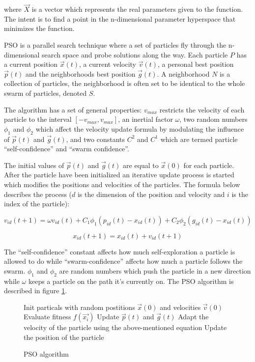 where $\vec{X}$ is a vector which represents the real parameters given to the function. The intent is to find a point in the n-dimensional parameter hyperspace that minimizes the function.

PSO is a parallel search technique where a set of particles  fly through the n-dimensional search space and probe solutions along the way. Each particle $P$ has a current position $\vec{x}(t)$, a current velocity $\vec{v}(t)$, a personal best position $\vec{p}(t)$ and the neighborhoods best position $\vec{g}(t)$. A neighborhood $N$ is a collection of particles, the neighborhood is often set to be identical to the whole swarm of particles, denoted $S$.

The algorithm has a set of general properties: $v_{max}$ restricts the velocity of each particle to the interval $[-v_{max},v_{max}]$, an inertial factor $\omega$, two random numbers $\phi_1$ and $\phi_2$ which affect the velocity update formula by modulating the influence of $\vec{p}(t)$ and $\vec{g}(t)$, and two constants $C^2$ and $C^1$ which are termed particle “self-confidence” and “swarm confidence”.

The initial values of $\vec{p}(t)$ and $\vec{g}(t)$ are equal to $\vec{x}(0)$ for each particle. After the particle have been initialized an iterative update process is started which modifies the positions and velocities of the particles. The formula below describes the process ($d$ is the dimension of the position and velocity and $i$ is the index of the particle):

\begin{equation}
  v_{id} (t+1) = \omega v_{id} (t) + C_1 \phi_1 (p_{id} (t) - x_{id} (t)) + C_2 \phi_2 (g_{id} (t) - x_{id} (t))
\end{equation}

\begin{equation}
  x_{id} (t+1) = x_{id} (t) + v_{id} (t+1)
\end{equation}

The “self-confidence” constant affects how much self-exploration a particle is allowed to do while “swarm-confidence” affects how much a particle follows the swarm. $\phi_1$ and $\phi_2$ are random numbers which push the particle in a new direction while $\omega$ keeps a particle on the path it’s currently on. The PSO algorithm is described in figure \ref{algo:pso}.

\begin{figure}[h]
  \centering
  \begin{minipage}{12.5cm}
    \begin{algorithmic}
      \State Init particals with random postitions
      $\vec{x}(0)$ and velocities $\vec{v}(0)$
      \Repeat
          \State Evaluate fitness $f(\vec{x_i})$
          \State Update $\vec{p}(t)$ and $\vec{g}(t)$
          \State Adapt the velocity of the particle using the above-mentioned equation
          \State Update the position of the particle
        \EndFor
    \end{algorithmic}
  \end{minipage}
  \caption{PSO algorithm}
  \label{algo:pso}
\end{figure}

